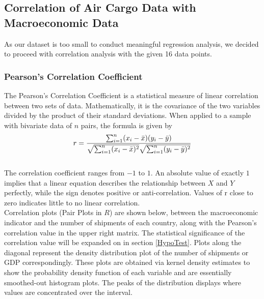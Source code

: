 \documentclass{article}
\begin{document}

\subsection{Correlation of Air Cargo Data with Macroeconomic Data}

As our dataset is too small to conduct meaningful regression analysis, we decided to proceed with correlation analysis with the given 16 data points. 

\subsubsection{Pearson's Correlation Coefficient}
The Pearson's Correlation Coefficient is a statistical measure of linear correlation between two sets of data. Mathematically, it is the covariance of the two variables divided by the product of their standard deviations. When applied to a sample with bivariate data of $n$ pairs, the formula is given by \\

\begin{equation}
    r = \frac{ \sum_{i=1}^{n}(x_i-\bar{x})(y_i-\bar{y}) }{%
        \sqrt{\sum_{i=1}^{n}(x_i-\bar{x})^2}\sqrt{\sum_{i=1}^{n}(y_i-\bar{y})^2}}
\end{equation} \\

\noindent The correlation coefficient ranges from $-1$ to $1$. An absolute value of exactly $1$ implies that a linear equation describes the relationship between $X$ and $Y$ perfectly, while the sign denotes positive or anti-correlation. Values of r close to zero indicates little to no linear correlation. \\

\noindent Correlation plots (Pair Plots in $R$) are shown below, between the macroeconomic indicator and the number of shipments of each country, along with the Pearson's correlation value in the upper right matrix. The statistical significance of the correlation value will be expanded on in section \ref{HypoTest}. Plots along the diagonal represent the density distribution plot of the number of shipments or GDP correspondingly. These plots are obtained via kernel density estimates to show the probability density function of each variable and are essentially smoothed-out histogram plots. The peaks of the distribution displays where values are concentrated over the interval. \\
\end{document}
